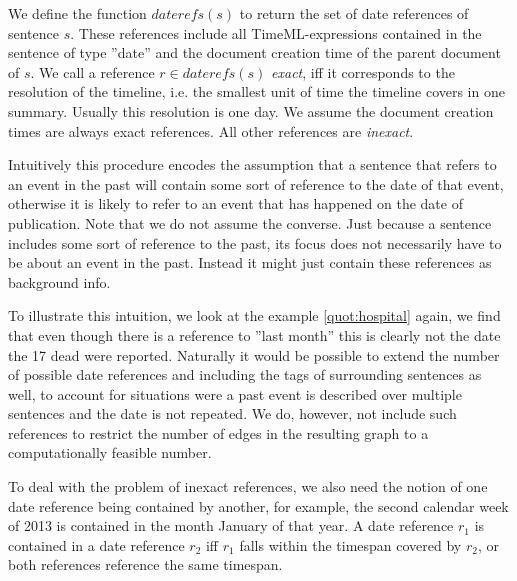 \documentclass[a4paper,BCOR=10mm]{report}
\numberwithin{lemma}{chapter}
\numberwithin{definition}{chapter}
\begin{document}
We define the function $\mathit{daterefs}(s)$ to return the set of date references of sentence $s$. These references include all TimeML-expressions \citep{timeml} contained in the sentence of type ''date'' and the document creation time of the parent document of $s$.
We call a reference $r \in \mathit{daterefs}(s)$ \textit{exact}, iff it corresponds to the resolution of the timeline, i.e. the smallest unit of time the timeline covers in one summary. Usually this resolution is one day. We assume the document creation times are always exact references. All other references are \textit{inexact}.

Intuitively this procedure encodes the assumption that a sentence that refers to an event in the past will contain some sort of reference to the date of that event, otherwise it is likely to refer to an event that has happened on the date of publication.
Note that we do not assume the converse. Just because a sentence includes some sort of reference to the past, its focus does not necessarily have to be about an event in the past. Instead it might just contain these references as background info.

To illustrate this intuition, we look at the example \ref{quot:hospital} again, we find that even though there is a reference to ''last month'' this is clearly not the date the 17 dead were reported.
Naturally it would be possible to extend the number of possible date references and including the tags of surrounding sentences as well, to account for situations were a past event is described over multiple sentences and the date is not repeated. We do, however, not include such references to restrict the number of edges in the resulting graph to a computationally feasible number.

To deal with the problem of inexact references, we also need the notion of one date reference being contained by another, for example, the second calendar week of 2013 is contained in the month January of that year.
A date reference $r_1$ is contained in a date reference $r_2$ iff $r_1$ falls within the timespan covered by $r_2$, or both references reference the same timespan.
\end{document}
